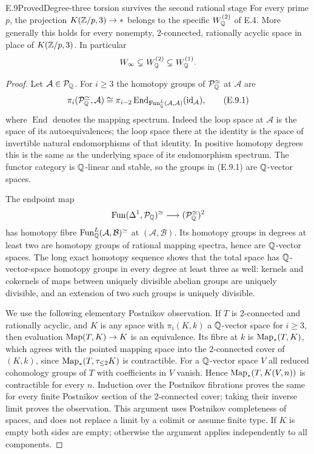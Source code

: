 \begin{claim}{E.9}{Proved}{Degree-three torsion survives the second rational stage}
For every prime $p$, the projection $K(\mathbb Z/p,3)\to *$ belongs to the
specific $W_\mathbb Q^{(2)}$ of E.4.  More generally this holds for every
nonempty, 2-connected, rationally acyclic space in place of
$K(\mathbb Z/p,3)$.  In particular
\[
             W_\infty\subsetneq W_\mathbb Q^{(2)}
                  \subsetneq W_\mathbb Q^{(1)}.
\]
\end{claim}
\begin{proof}
Let $\mathcal A\in\mathcal P_\mathbb Q$.  For $i\ge3$ the homotopy
groups of $\mathcal P_\mathbb Q^{\simeq}$ at $\mathcal A$ are
\[
 \pi_i(\mathcal P_\mathbb Q^{\simeq},\mathcal A)
 \cong \pi_{i-2}
   \operatorname{End}_{\operatorname{Fun}_\mathbb Q^L(\mathcal A,\mathcal A)}
                         (\mathrm{id}_{\mathcal A}),                 \tag{E.9.1}
\]
where $\operatorname{End}$ denotes the mapping spectrum.  Indeed the
loop space at $\mathcal A$ is the space of its autoequivalences; the
loop space there at the identity is the space of invertible natural
endomorphisms of that identity.  In positive homotopy degrees this is
the same as the underlying space of its endomorphism spectrum.  The
functor category is $\mathbb Q$-linear and stable, so the groups in
(E.9.1) are $\mathbb Q$-vector spaces.

The endpoint map
\[
 \operatorname{Fun}(\Delta^1,\mathcal P_\mathbb Q)^{\simeq}
       \longrightarrow (\mathcal P_\mathbb Q^{\simeq})^2
\]
has homotopy fibre
$\operatorname{Fun}_\mathbb Q^L(\mathcal A,\mathcal B)^{\simeq}$ at
$(\mathcal A,\mathcal B)$.  Its homotopy groups in degrees at least
two are homotopy groups of rational mapping spectra, hence are
$\mathbb Q$-vector spaces.  The long exact homotopy sequence shows that
the total space has $\mathbb Q$-vector-space homotopy groups in every
degree at least three as well: kernels and cokernels of maps between
uniquely divisible abelian groups are uniquely divisible, and an
extension of two such groups is uniquely divisible.

We use the following elementary Postnikov observation.  If $T$ is
2-connected and rationally acyclic, and $K$ is any space with
$\pi_i(K,k)$ a $\mathbb Q$-vector space for $i\ge3$, then evaluation
$\operatorname{Map}(T,K)\to K$ is an equivalence.  Its fibre at $k$ is
$\operatorname{Map}_*(T,K)$, which agrees with the pointed mapping space into
the 2-connected cover of $(K,k)$, since
$\operatorname{Map}_*(T,\tau_{\le2}K)$ is contractible.  For a $\mathbb Q$-vector
space $V$ all reduced cohomology groups of $T$ with coefficients
in $V$ vanish.  Hence $\operatorname{Map}_*(T,K(V,n))$ is contractible for
every $n$.  Induction over the Postnikov fibrations proves the same
for every finite Postnikov section of the 2-connected cover; taking
their inverse limit proves the observation.  This argument uses
Postnikov completeness of spaces, and does not replace a limit by a
colimit or assume finite type.  If $K$ is empty both sides are empty;
otherwise the argument applies independently to all components.


\end{proof}
